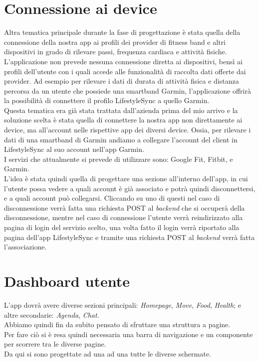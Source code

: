 \section{Connessione ai device}
Altra tematica principale durante la fase di progettazione è stata quella della connessione della nostra app ai profili dei provider di fitness band e altri dispositivi in grado di rilevare passi, frequenza cardiaca e attività fisiche.\\
L’applicazione non prevede nessuna connessione diretta ai dispositivi, bensì ai profili dell’utente con i quali accede alle funzionalità di raccolta dati offerte dai provider. Ad esempio per rilevare i dati di durata di attività fisica e distanza percorsa da un utente che possiede una smartband Garmin, l’applicazione offrirà la possibilità di connettere il profilo LifestyleSync a quello Garmin.\\
Questa tematica era già stata trattata dall'azienda prima del mio arrivo e la soluzione scelta è stata quella di connettere la nostra app non direttamente ai device, ma all'account nelle rispettive app dei diversi device. Ossia, per rilevare i dati di una smartband di Garmin andiamo a collegare l'account del client in LifestyleSync al suo account nell'app Garmin.\\
I servizi che attualmente si prevede di utilizzare sono: Google Fit, Fitbit, e Garmin.\\
L'idea è stata quindi quella di progettare una sezione all'interno dell'app, in cui l'utente possa vedere a quali account è già associato e potrà quindi disconnettersi, e a quali account può collegarsi. Cliccando su uno di questi nel caso di disconnessione verrà fatta una richiesta POST al \textit{backend} che si occuperà della disconnessione, mentre nel caso di connessione l'utente verrà reindirizzato alla pagina di login del servizio scelto, una volta fatto il login verrà riportato alla pagina dell'app LifestyleSync e tramite una richiesta POST al \textit{backend} verrà fatta l'associazione.
\section{Dashboard utente}
L'app dovrà avere diverse sezioni principali: \textit{Homepage}, \textit{Move}, \textit{Food}, \textit{Health}; e altre secondarie: \textit{Agenda}, \textit{Chat}.\\
Abbiamo quindi fin da subito pensato di sfruttare una struttura a pagine.\\
Per fare ciò si è resa quindi necessaria una barra di navigazione e un componente per scorrere tra le diverse pagine.\\
Da qui si sono progettate ad una ad una tutte le diverse schermate.
